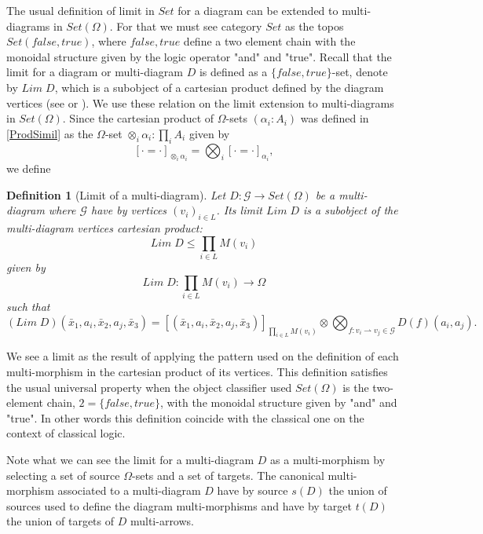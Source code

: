 \documentclass[oribibl]{llncs}
\newtheorem{defn}{Definition}
\newcommand{\G}{\mathcal{G}}
\begin{document}
The usual definition of limit in $Set$ for a diagram can be extended to multi-diagrams in $Set(\Omega)$. For that we must see category $Set$ as the topos $Set({false,true})$, where ${false,true}$ define a two element chain with the monoidal structure given by the logic operator "and" and "true". Recall that the limit for a diagram or multi-diagram $D$ is defined as a $\{false,true\}$-set, denote by $Lim\; D$, which is a subobject of a cartesian product defined by the diagram vertices (see \cite{maclane71} or \cite{Borceux94}). We use these relation on the limit extension to multi-diagrams in $Set(\Omega)$. Since the cartesian product of $\Omega$-sets $(\alpha_i:A_i)$ was defined in \ref{ProdSimil} as the $\Omega$-set $\otimes_i\alpha_i:\prod_iA_i$ given by
\[
[\cdot=\cdot]_{\otimes_i\alpha_i}=\bigotimes_i[\cdot=\cdot]_{\alpha_i},
\]
we define
\begin{defn}[Limit of a multi-diagram]\label{lim}
Let $D:\G\rightarrow Set(\Omega)$ be a multi-diagram where $\G$ have by vertices $(v_i)_{i\in L}$. Its limit $Lim\;D$ is a subobject of the multi-diagram vertices cartesian product:
\[
Lim\; D \leq \prod_{i\in L} M(v_i)
\]
given by
 \[
Lim\; D: \prod_{i\in L} M(v_i) \rightarrow \Omega
\]
such that
\[
(Lim\;D)(\bar{x}_1,a_{i},\bar{x}_2,a_{j},\bar{x}_3)=[(\bar{x}_1,a_{i},\bar{x}_2,a_{j},\bar{x}_3)]_{\prod_{i\in L}M(v_i)}\otimes\bigotimes_{f:v_i\rightharpoonup v_j\in \G} D(f)(a_{i},a_{j}).
\]

\end{defn}
We see a limit as the result of applying the pattern used on the definition of each multi-morphism in the cartesian product of its vertices. This definition satisfies the usual universal property when the object classifier used $Set(\Omega)$ is the two-element chain, $2=\{false,true\}$, with the monoidal structure given by "and" and "true". In other words this definition coincide with the classical one on the context of classical logic.

Note what we can see the limit for a multi-diagram  $D$ as a multi-morphism by selecting a set of source $\Omega$-sets and a set of targets. The canonical multi-morphism associated to a multi-diagram $D$ have by source $s(D)$ the union of sources used to define the diagram multi-morphisms and have by target $t(D)$ the union of targets of $D$ multi-arrows.
\end{document}
